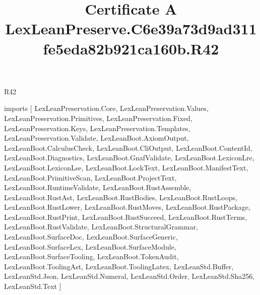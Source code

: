 \begin{lexlean}{R42}
\title{Certificate A LexLeanPreserve.C6e39a73d9ad311fe5eda82b921ca160b.R42}
\begin{coremodule}
imports [
  LexLeanPreservation.Core,
  LexLeanPreservation.Values,
  LexLeanPreservation.Primitives,
  LexLeanPreservation.Fixed,
  LexLeanPreservation.Keys,
  LexLeanPreservation.Templates,
  LexLeanPreservation.Validate,
  LexLeanBoot.AxiomOutput,
  LexLeanBoot.CalculusCheck,
  LexLeanBoot.CliOutput,
  LexLeanBoot.ContentId,
  LexLeanBoot.Diagnostics,
  LexLeanBoot.GnafValidate,
  LexLeanBoot.LexiconLre,
  LexLeanBoot.LexiconLse,
  LexLeanBoot.LockText,
  LexLeanBoot.ManifestText,
  LexLeanBoot.PrimitiveScan,
  LexLeanBoot.ProjectText,
  LexLeanBoot.RuntimeValidate,
  LexLeanBoot.RustAssemble,
  LexLeanBoot.RustAst,
  LexLeanBoot.RustBodies,
  LexLeanBoot.RustLoops,
  LexLeanBoot.RustLower,
  LexLeanBoot.RustMoves,
  LexLeanBoot.RustPackage,
  LexLeanBoot.RustPrint,
  LexLeanBoot.RustSucceed,
  LexLeanBoot.RustTerms,
  LexLeanBoot.RustValidate,
  LexLeanBoot.StructuralGrammar,
  LexLeanBoot.SurfaceDoc,
  LexLeanBoot.SurfaceGeneric,
  LexLeanBoot.SurfaceLex,
  LexLeanBoot.SurfaceModule,
  LexLeanBoot.SurfaceTooling,
  LexLeanBoot.TokenAudit,
  LexLeanBoot.ToolingAst,
  LexLeanBoot.ToolingLatex,
  LexLeanStd.Buffer,
  LexLeanStd.Json,
  LexLeanStd.Numeral,
  LexLeanStd.Order,
  LexLeanStd.Sha256,
  LexLeanStd.Text
]


\end{coremodule}
\end{lexlean}
